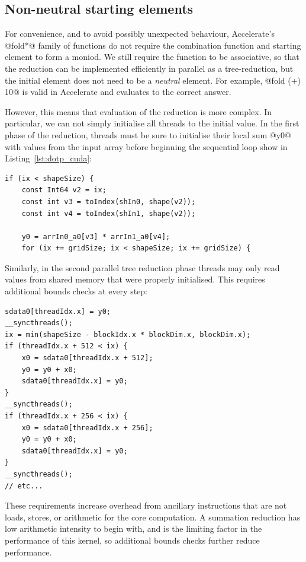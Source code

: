\subsection{Non-neutral starting elements}
\label{sec:non-neutral_starting_elements}

For convenience, and to avoid possibly unexpected behaviour, Accelerate's
@fold*@ family of functions do not require the combination function and
starting element to form a moniod. We still require the function to be
associative, so that the reduction can be implemented efficiently in parallel as
a tree-reduction, but the initial element does not need to be a \emph{neutral}
element. For example, @fold (+) 10@ is valid in
Accelerate and evaluates to the correct answer.

However, this means that evaluation of the reduction is more complex. In
particular, we can not simply initialise all threads to the initial value.
In the first phase of the reduction, threads must be sure to initialise
their local sum @y0@ with values from the input array before beginning the
sequential loop show in Listing~\ref{lst:dotp_cuda}:
%
\begin{lstlisting}[style=cuda,firstnumber=12]
if (ix < shapeSize) {
    const Int64 v2 = ix;
    const int v3 = toIndex(shIn0, shape(v2));
    const int v4 = toIndex(shIn1, shape(v2));

    y0 = arrIn0_a0[v3] * arrIn1_a0[v4];
    for (ix += gridSize; ix < shapeSize; ix += gridSize) {
\end{lstlisting}

Similarly, in the second parallel tree reduction phase threads may only read
values from shared memory that were properly initialised. This requires
additional bounds checks at every step:
%
\begin{lstlisting}[style=cuda,firstnumber=27]
sdata0[threadIdx.x] = y0;
__syncthreads();
ix = min(shapeSize - blockIdx.x * blockDim.x, blockDim.x);
if (threadIdx.x + 512 < ix) {
    x0 = sdata0[threadIdx.x + 512];
    y0 = y0 + x0;
    sdata0[threadIdx.x] = y0;
}
__syncthreads();
if (threadIdx.x + 256 < ix) {
    x0 = sdata0[threadIdx.x + 256];
    y0 = y0 + x0;
    sdata0[threadIdx.x] = y0;
}
__syncthreads();
// etc...
\end{lstlisting}

These requirements increase overhead from ancillary instructions that are not
loads, stores, or arithmetic for the core computation. A summation reduction has
low arithmetic intensity to begin with, and is the limiting factor in the
performance of this kernel, so additional bounds checks further reduce
performance.

